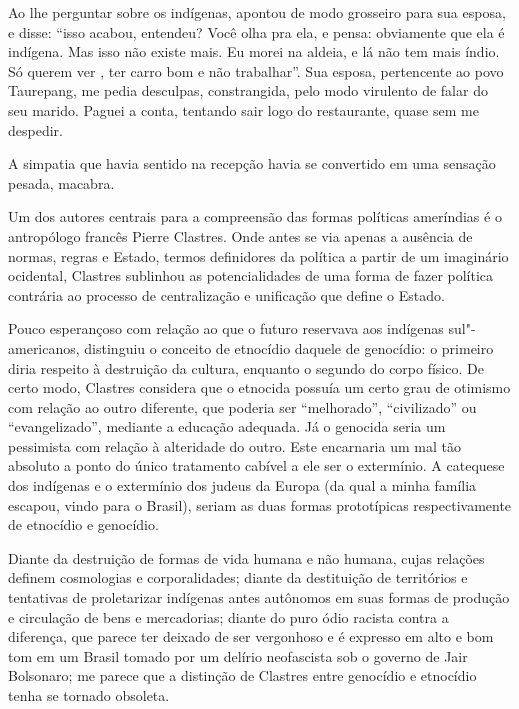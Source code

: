Ao lhe perguntar sobre os indígenas, apontou de modo grosseiro para sua
esposa, e disse: ``isso acabou, entendeu? Você olha pra ela, e pensa:
obviamente que ela é indígena. Mas isso não existe mais. Eu morei na
aldeia, e lá não tem mais índio. Só querem ver , ter carro bom e não
trabalhar''. Sua esposa, pertencente ao povo Taurepang, me pedia
desculpas, constrangida, pelo modo virulento de falar do seu marido.
Paguei a conta, tentando sair logo do restaurante, quase sem me
despedir.

A simpatia que havia sentido na recepção havia se convertido
em uma sensação pesada, macabra.

\asterisc

Um dos autores centrais para a compreensão das formas políticas
ameríndias é o antropólogo francês Pierre Clastres.
Onde antes se via apenas a ausência de normas, regras
e Estado, termos definidores da política a partir de um imaginário
ocidental, Clastres sublinhou as potencialidades de uma forma de fazer
política contrária ao processo de centralização e unificação que define o
Estado.

Pouco esperançoso com relação ao que o futuro reservava aos indígenas sul"-americanos, distinguiu o conceito de etnocídio daquele de genocídio: o
primeiro diria respeito à destruição da cultura, enquanto o segundo do
corpo físico. De certo modo, Clastres considera que o etnocida possuía
um certo grau de otimismo com relação ao outro diferente, que poderia
ser ``melhorado'', ``civilizado'' ou ``evangelizado'', mediante a
educação adequada. Já o genocida seria um pessimista com relação à
alteridade do outro. Este encarnaria um mal tão absoluto a ponto do único
tratamento cabível a ele ser o extermínio. A catequese dos
indígenas e o extermínio dos judeus da Europa (da qual a minha família
escapou, vindo para o Brasil), seriam as duas formas prototípicas
respectivamente de etnocídio e genocídio.

Diante da destruição de formas de vida humana e não humana, cujas
relações definem cosmologias e corporalidades; diante da destituição de
territórios e tentativas de proletarizar indígenas antes autônomos em
suas formas de produção e circulação de bens e mercadorias; diante do
puro ódio racista contra a diferença, que parece ter deixado de ser
vergonhoso e é expresso em alto e bom tom em um Brasil tomado por um
delírio neofascista sob o governo de Jair Bolsonaro; me parece que a
distinção de Clastres entre genocídio e etnocídio tenha se tornado
obsoleta.

